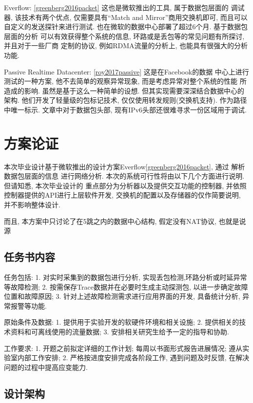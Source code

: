 {\begin{mdframed}[everyline=true]
Everflow: \ref{greenberg2016packet} 这也是微软推出的工具,
属于数据包层面的 调试器, 该技术有两个优点, 仅需要具有``Match and
Mirror''商用交换机即可, 而且可以 自定义的发送探针来进行测试.
也在微软的数据中心部署了超过6个月. 基于数据包层面的分析
可以有效获得整个系统的信息, 环路或是丢包等的常见问题有所探讨,
并且对于一些厂商 定制的协议, 例如RDMA流量的分析上,
也能具有很强大的分析功能.

Passive Realtime Datacenter: \ref{roy2017passive} 这是在Facebook的数据
中心上进行测试的一种方案, 他不去简单的观察异常现象,
而是考虑异常对整个系统的性能 所造成的影响. 虽然是基于这么一种简单的设想.
但其实现需要深深结合数据中心的架构. 他们开发了轻量级的包标记技术,
仅仅使用转发规则(交换机支持). 作为路径中唯一标示. 文章中对于数据包头部,
现有IPv6头部还很难寻求一份区域用于调试.

\section{方案论证}

本次毕业设计基于微软推出的设计方案Everflow\ref{greenberg2016packet},
通过 解析数据包层面的信息 进行网络分析.
本次的系统可行性将由以下几个方面进行说明. 但请知悉, 本次毕业设计的
重点部分为分析器以及提供交互功能的控制器,
并依照控制器提供的API进行上层软件开发,
交换机的配置以及存储器的仅作简要说明, 并不影响整体设计.

而且, 本方案中只讨论了在5跳之内的数据中心结构, 假定没有NAT协议,
也就是说源

\subsection{任务书内容}

任务包括: 1. 对实时采集到的数据包进行分析,
实现丢包检测,环路分析或时延异常等故障检测; 2.
按需保存Trace数据并在必要时生成主动探测包,
以进一步确定故障位置和故障原因; 3.
针对上述故障检测需求进行应用界面的开发, 具备统计分析, 异常报警等功能.

原始条件及数据: 1. 提供用于实验开发的软硬件环境和相关设施; 2.
提供相关的技术资料和可离线使用的流量数据; 3.
安排相关研究生给予一定的指导和协助.

工作要求: 1. 开题之前拟定详细的工作计划; 每周以书面形式报告进展情况;
遵从实验室内部工作安排; 2. 严格按进度安排完成各阶段工作,
遇到问题及时反馈, 在解决问题的过程中提高应变能力.

\subsection{设计架构}


\end{mdframed}}
